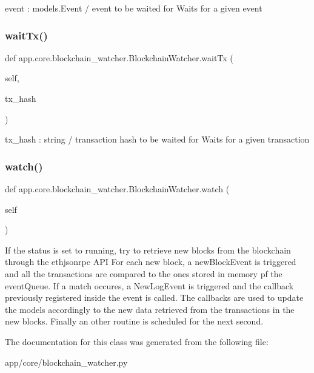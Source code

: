 \begin{DoxyVerb}event : models.Event  / event to be waited for
Waits for a given event
\end{DoxyVerb}
 \mbox{\label{classapp_1_1core_1_1blockchain__watcher_1_1_blockchain_watcher_a512a645e5cd62f93edb45222c8e531be}} 
\subsubsection{\texorpdfstring{wait\+Tx()}{waitTx()}}
{\footnotesize\ttfamily def app.\+core.\+blockchain\+\_\+watcher.\+Blockchain\+Watcher.\+wait\+Tx (\begin{DoxyParamCaption}\item[{}]{self,  }\item[{}]{tx\+\_\+hash }\end{DoxyParamCaption})}

\begin{DoxyVerb}tx_hash : string / transaction hash to be waited for
Waits for a given transaction
\end{DoxyVerb}
 \mbox{\label{classapp_1_1core_1_1blockchain__watcher_1_1_blockchain_watcher_af61c2c7866ec479d80b5fa6c649fc2ad}} 
\subsubsection{\texorpdfstring{watch()}{watch()}}
{\footnotesize\ttfamily def app.\+core.\+blockchain\+\_\+watcher.\+Blockchain\+Watcher.\+watch (\begin{DoxyParamCaption}\item[{}]{self }\end{DoxyParamCaption})}

\begin{DoxyVerb}If the status is set to running, try to retrieve new blocks from the blockchain through the ethjsonrpc API
For each new block, a newBlockEvent is triggered and all the transactions are compared to the ones stored in memory pf the eventQueue. If a match occures, a NewLogEvent is triggered and the callback previously registered inside the event is called.
The callbacks are used to update the models accordingly to the new data retrieved from the transactions in the new blocks.
Finally an other routine is scheduled for the next second.
\end{DoxyVerb}
 

The documentation for this class was generated from the following file\+:\begin{DoxyCompactItemize}
\item 
app/core/blockchain\+\_\+watcher.\+py\end{DoxyCompactItemize}
